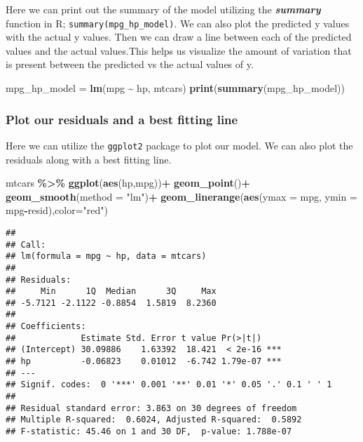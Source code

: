 \documentclass[
]{book}
\newenvironment{Shaded}{\begin{snugshade}}{\end{snugshade}}
\newcommand{\AttributeTok}[1]{\textcolor[rgb]{0.13,0.29,0.53}{#1}}
\newcommand{\FunctionTok}[1]{\textcolor[rgb]{0.13,0.29,0.53}{\textbf{#1}}}
\newcommand{\NormalTok}[1]{#1}
\newcommand{\OtherTok}[1]{\textcolor[rgb]{0.56,0.35,0.01}{#1}}
\newcommand{\SpecialCharTok}[1]{\textcolor[rgb]{0.81,0.36,0.00}{\textbf{#1}}}
\newcommand{\StringTok}[1]{\textcolor[rgb]{0.31,0.60,0.02}{#1}}
\theoremstyle{definition}
\theoremstyle{definition}
\theoremstyle{definition}
\theoremstyle{definition}
\theoremstyle{remark}
\begin{document}
Here we can print out the summary of the model utilizing the \textbf{\emph{summary}} function in R; \texttt{summary(mpg\_hp\_model)}. We can also plot the predicted y values with the actual y values. Then we can draw a line between each of the predicted values and the actual values.This helps us visualize the amount of variation that is present between the predicted vs the actual values of y.

\begin{Shaded}
\begin{Highlighting}[]
\NormalTok{mpg\_hp\_model }\OtherTok{=} \FunctionTok{lm}\NormalTok{(mpg }\SpecialCharTok{\textasciitilde{}}\NormalTok{ hp, mtcars)}
\FunctionTok{print}\NormalTok{(}\FunctionTok{summary}\NormalTok{(mpg\_hp\_model))}
\end{Highlighting}
\end{Shaded}

\hypertarget{plot-our-residuals-and-a-best-fitting-line}{%
\subsubsection{Plot our residuals and a best fitting line}\label{plot-our-residuals-and-a-best-fitting-line}}

Here we can utilize the \texttt{ggplot2} package to plot our model. We can also plot the residuals along with a best fitting line.

\begin{Shaded}
\begin{Highlighting}[]
\NormalTok{mtcars }\SpecialCharTok{\%\textgreater{}\%} \FunctionTok{ggplot}\NormalTok{(}\FunctionTok{aes}\NormalTok{(hp,mpg))}\SpecialCharTok{+}
  \FunctionTok{geom\_point}\NormalTok{()}\SpecialCharTok{+}
  \FunctionTok{geom\_smooth}\NormalTok{(}\AttributeTok{method =} \StringTok{"lm"}\NormalTok{)}\SpecialCharTok{+}
  \FunctionTok{geom\_linerange}\NormalTok{(}\FunctionTok{aes}\NormalTok{(}\AttributeTok{ymax =}\NormalTok{ mpg, }\AttributeTok{ymin =}\NormalTok{ mpg}\SpecialCharTok{{-}}\NormalTok{resid),}\AttributeTok{color=}\StringTok{"red"}\NormalTok{)}
\end{Highlighting}
\end{Shaded}

\begin{verbatim}
## 
## Call:
## lm(formula = mpg ~ hp, data = mtcars)
## 
## Residuals:
##     Min      1Q  Median      3Q     Max 
## -5.7121 -2.1122 -0.8854  1.5819  8.2360 
## 
## Coefficients:
##             Estimate Std. Error t value Pr(>|t|)    
## (Intercept) 30.09886    1.63392  18.421  < 2e-16 ***
## hp          -0.06823    0.01012  -6.742 1.79e-07 ***
## ---
## Signif. codes:  0 '***' 0.001 '**' 0.01 '*' 0.05 '.' 0.1 ' ' 1
## 
## Residual standard error: 3.863 on 30 degrees of freedom
## Multiple R-squared:  0.6024, Adjusted R-squared:  0.5892 
## F-statistic: 45.46 on 1 and 30 DF,  p-value: 1.788e-07
\end{verbatim}
\end{document}
